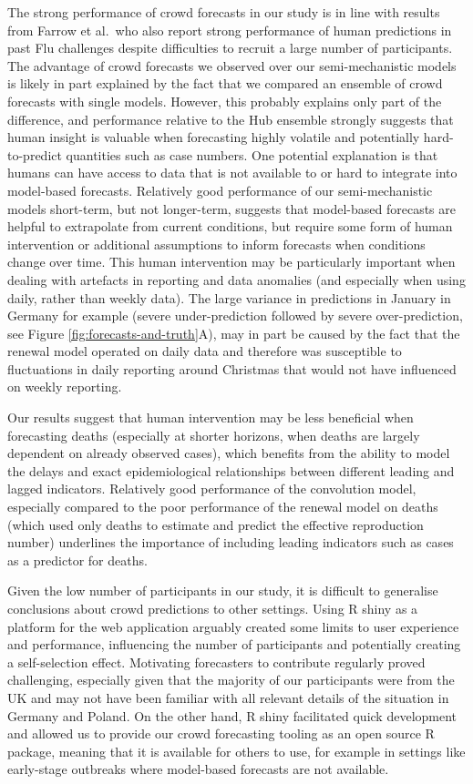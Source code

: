 \documentclass[
]{article}
\begin{document}
The strong performance of crowd forecasts in our study is in line with results from Farrow et al.~who also report strong performance of human predictions in past Flu challenges despite difficulties to recruit a large number of participants. The advantage of crowd forecasts we observed over our semi-mechanistic models is likely in part explained by the fact that we compared an ensemble of crowd forecasts with single models. However, this probably explains only part of the difference, and performance relative to the Hub ensemble strongly suggests that human insight is valuable when forecasting highly volatile and potentially hard-to-predict quantities such as case numbers. One potential explanation is that humans can have access to data that is not available to or hard to integrate into model-based forecasts. Relatively good performance of our semi-mechanistic models short-term, but not longer-term, suggests that model-based forecasts are helpful to extrapolate from current conditions, but require some form of human intervention or additional assumptions to inform forecasts when conditions change over time. This human intervention may be particularly important when dealing with artefacts in reporting and data anomalies (and especially when using daily, rather than weekly data). The large variance in predictions in January in Germany for example (severe under-prediction followed by severe over-prediction, see Figure \ref{fig:forecasts-and-truth}A), may in part be caused by the fact that the renewal model operated on daily data and therefore was susceptible to fluctuations in daily reporting around Christmas that would not have influenced on weekly reporting.

Our results suggest that human intervention may be less beneficial when forecasting deaths (especially at shorter horizons, when deaths are largely dependent on already observed cases), which benefits from the ability to model the delays and exact epidemiological relationships between different leading and lagged indicators. Relatively good performance of the convolution model, especially compared to the poor performance of the renewal model on deaths (which used only deaths to estimate and predict the effective reproduction number) underlines the importance of including leading indicators such as cases as a predictor for deaths.

Given the low number of participants in our study, it is difficult to generalise conclusions about crowd predictions to other settings. Using R shiny as a platform for the web application arguably created some limits to user experience and performance, influencing the number of participants and potentially creating a self-selection effect. Motivating forecasters to contribute regularly proved challenging, especially given that the majority of our participants were from the UK and may not have been familiar with all relevant details of the situation in Germany and Poland. On the other hand, R shiny facilitated quick development and allowed us to provide our crowd forecasting tooling as an open source R package, meaning that it is available for others to use, for example in settings like early-stage outbreaks where model-based forecasts are not available.
\end{document}
